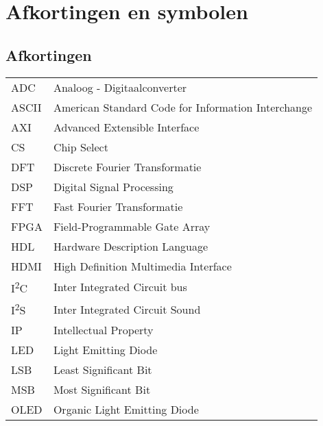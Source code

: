 \chapter{Afkortingen en symbolen}
\section*{Afkortingen}
\begin{flushleft}
  \renewcommand{\arraystretch}{1.1}
  \begin{tabularx}{\textwidth}{@{}p{12mm}X@{}}
        ADC     & Analoog - Digitaalconverter                           \\													
        ASCII   & American Standard Code for Information Interchange    \\													
        AXI		& Advanced Extensible Interface							\\				
        CS		& Chip Select											\\
        DFT     & Discrete Fourier Transformatie                        \\													
        DSP     & Digital Signal Processing                             \\													
        FFT     & Fast Fourier Transformatie                            \\													
        FPGA    & Field-Programmable Gate Array                         \\													
        HDL     & Hardware Description Language                         \\													
        HDMI    & High Definition Multimedia Interface                  \\													
        I\textsuperscript{2}C     & Inter Integrated Circuit bus        \\													
        I\textsuperscript{2}S     & Inter Integrated Circuit Sound      \\													
        IP      & Intellectual Property                                 \\													
        LED 	& Light Emitting Diode									\\			
        LSB     & Least Significant Bit                                 \\													
        MSB     & Most Significant Bit                                  \\													
        OLED    & Organic Light Emitting Diode                          \\													

\end{tabularx}
\end{flushleft}
